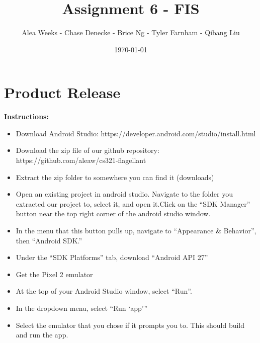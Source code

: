 \documentclass[a4paper]{article}
\title{Assignment 6 - FIS}
\author{Alea Weeks - Chase Denecke - Brice Ng - Tyler Farnham - Qibang Liu}
\date{\today}
\begin{document}
\maketitle
\section{Product Release}
\textbf{Instructions:}
\begin{itemize}
\item Download Android Studio: https://developer.android.com/studio/install.html
\item Download the zip file of our github repository: https://github.com/aleaw/cs321-flagellant
\item Extract the zip folder to somewhere you can find it (downloads)
\item Open an existing project in android studio. Navigate to the folder you extracted our project to, select it, and open it.Click on the “SDK Manager” button near the top right corner of the android studio window.
\item In the menu that this button pulls up, navigate to “Appearance \& Behavior”, then “Android SDK.”
\item Under the “SDK Platforms” tab, download “Android API 27”
\item Get the Pixel 2 emulator
\item At the top of your Android Studio window, select “Run”.
\item In the dropdown menu, select “Run ‘app’”
\item Select the emulator that you chose if it prompts you to. This should build and run the app.
\end{itemize}
\end{document}

